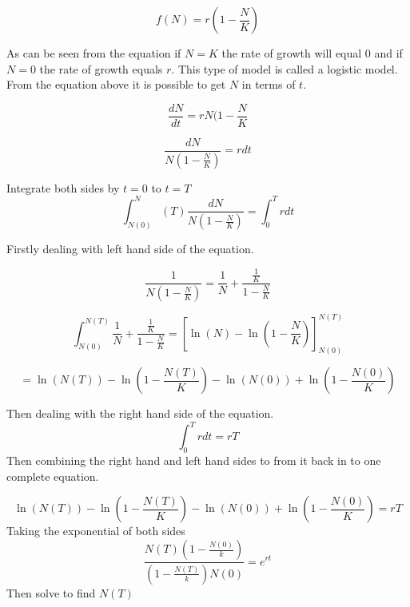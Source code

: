 \documentclass[final]{cmpreport}
\begin{document}
	
		\begin{equation} 
		f(N) =r(1-\frac{N}{K})
		\end{equation}
		
	As can be seen from the equation if $N=K$ the rate of growth will equal 0 and if $N=0$ the rate of growth equals $r$. This type of model is called a logistic model. From the equation above it is possible to get $N$ in terms of $t$.
		
		
		
		\begin{equation} 
			\frac{dN}{dt} = rN(1-\frac{N}{K} 
		\end{equation}
		
		\begin{equation} 
		\frac{dN}{N(1-\frac{N}{K})} = rdt 
		\end{equation}
		
		Integrate both sides by $t=0$ to $t=T$
		\begin{equation} 
		 \int_{N(0)}^N(T) \frac{dN}{N(1-\frac{N}{K})} = \int_{0}^T rdt 
		\end{equation}
		
		Firstly dealing with left hand side of the equation.
		
		\begin{equation} 
		 \frac{1}{N(1-\frac{N}{K})} = \frac{1}{N} +  \frac{ \frac{1}{K}}{1 -  \frac{N}{K} } 
		 \end{equation}
		 
		 \begin{equation} 
		 \int_{N(0)}^{N(T)} \frac{1}{N} +  \frac{ \frac{1}{K}}{1 -  \frac{N}{K} } = [ \ln(N) - \ln(1-\frac{N}{K}) ]_{N(0)}^{N(T)} 
		\end{equation}
		
		\begin{equation} 
		 =\ln(N(T)) - \ln(1-\frac{N(T)}{K}) - \ln(N(0))+\ln(1-\frac{N(0)}{K}) 
		\end{equation}
		
		
		Then dealing with the right hand side of the equation. 
		\begin{equation}
		\int_{0}^T rdt = rT 
		\end{equation}
		Then combining the right hand and left hand sides to from it back in to one complete equation.
		
		\begin{equation} 
		\ln(N(T)) - \ln(1-\frac{N(T)}{K}) - \ln(N(0))+\ln(1-\frac{N(0)}{K})= rT
		\end{equation}
		Taking the exponential of both sides
		\begin{equation} 
		\frac{N(T)(1-\frac{N(0)}{k})}{(1-\frac{N(T)}{k} )N(0)}=e^{rt} 
		\end{equation}
		Then solve to find $N(T)$
		
\end{document}
